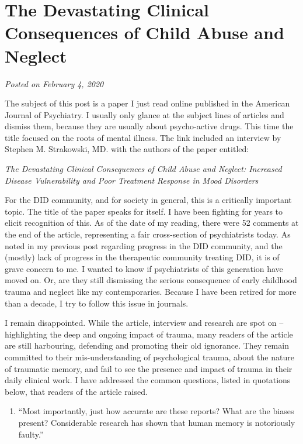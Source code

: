 \documentclass[]{book}
\providecommand{\tightlist}{%
  \setlength{\itemsep}{0pt}\setlength{\parskip}{0pt}}
\begin{document}
\hypertarget{the-devastating-clinical-consequences-of-child-abuse-and-neglect}{%
\section{The Devastating Clinical Consequences of Child Abuse and Neglect}\label{the-devastating-clinical-consequences-of-child-abuse-and-neglect}}

\emph{Posted on February 4, 2020}

The subject of this post is a paper I just read online published in the American Journal of Psychiatry. I usually only glance at the subject lines of articles and dismiss them, because they are usually about psycho-active drugs. This time the title focused on the roots of mental illness. The link included an interview by Stephen M. Strakowski, MD. with the authors of the paper entitled:

\emph{The Devastating Clinical Consequences of Child Abuse and Neglect: Increased Disease Vulnerability and Poor Treatment Response in Mood Disorders}

For the DID community, and for society in general, this is a critically important topic. The title of the paper speaks for itself. I have been fighting for years to elicit recognition of this. As of the date of my reading, there were 52 comments at the end of the article, representing a fair cross-section of psychiatrists today.
As noted in my previous post regarding progress in the DID community, and the (mostly) lack of progress in the therapeutic community treating DID, it is of grave concern to me. I wanted to know if psychiatrists of this generation have moved on. Or, are they still dismissing the serious consequence of early childhood trauma and neglect like my contemporaries. Because I have been retired for more than a decade, I try to follow this issue in journals.

I remain disappointed. While the article, interview and research are spot on -- highlighting the deep and ongoing impact of trauma, many readers of the article are still harbouring, defending and promoting their old ignorance. They remain committed to their mis-understanding of psychological trauma, about the nature of traumatic memory, and fail to see the presence and impact of trauma in their daily clinical work. I have addressed the common questions, listed in quotations below, that readers of the article raised.

\begin{enumerate}
\def\labelenumi{\arabic{enumi}.}
\tightlist
\item
  ``Most importantly, just how accurate are these reports? What are the biases present? Considerable research has shown that human memory is notoriously faulty.''
\end{enumerate}
\end{document}
